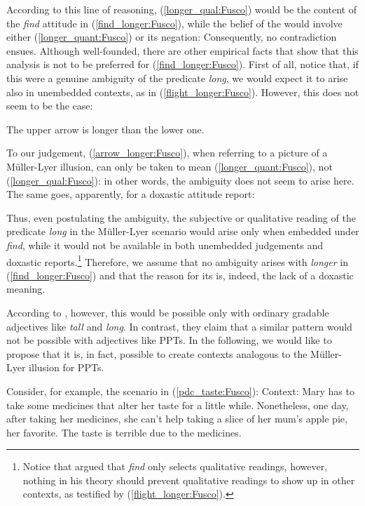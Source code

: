 \documentclass[output=paper,colorlinks,citecolor=brown]{langscibook}
\begin{document}
According to this line of reasoning, (\ref{longer_qual:Fusco}) would be the content of the \textit{find} attitude in (\ref{find_longer:Fusco}), while the belief of the  would involve either (\ref{longer_quant:Fusco}) or its negation: Consequently, no contradiction ensues. Although well-founded, there are other empirical facts that show that this analysis is not to be preferred for (\ref{find_longer:Fusco}). First of all, notice that, if this were a genuine ambiguity of the predicate \textit{long}, we would expect it to arise also in unembedded contexts, as in (\ref{flight_longer:Fusco}). However, this does not seem to be the case:

\ea \label{arrow_longer:Fusco} {The upper arrow is longer than the lower one.}
\z

To our judgement, (\ref{arrow_longer:Fusco}), when referring to a picture of a Müller-Lyer illusion, can only be taken to mean (\ref{longer_quant:Fusco}), not (\ref{longer_qual:Fusco}): in other words, the ambiguity does not seem to arise here. The same goes, apparently, for a doxastic attitude report:

\z

Thus, even postulating the ambiguity, the subjective or qualitative reading of the predicate \textit{long} in the Müller-Lyer scenario would arise only when embedded under \textit{find}, while it would not be available in both unembedded judgements and doxastic reports.\footnote{Notice that \citet{kennedy_2013} argued that \textit{find} only selects qualitative readings, however, nothing in his theory should prevent qualitative readings to show up in other contexts, as testified by (\ref{flight_longer:Fusco}).} Therefore, we assume that no ambiguity arises with \textit{longer} in (\ref{find_longer:Fusco}) and that the reason for its  is, indeed, the lack of a doxastic meaning. 

According to \citet{crespo2019tasting}, however, this would be possible only with ordinary gradable adjectives like \textit{tall} and \textit{long}. In contrast, they claim that a similar pattern would not be possible with adjectives like PPTs. In the following, we would like to propose that it is, in fact, possible to create contexts analogous to the Müller-Lyer illusion for PPTs.

Consider, for example, the scenario in (\ref{pdc_taste:Fusco}):
\ea \label{pdc_taste:Fusco}Context: Mary has to take some medicines that alter her taste for a little while. Nonetheless, one day, after taking her medicines, she can’t help taking a slice of her mum’s apple pie, her favorite. The taste is terrible due to the medicines.
\end{document}
